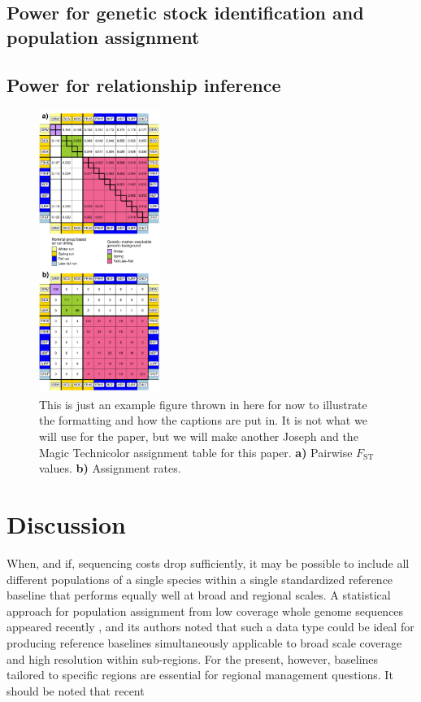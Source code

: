 \subsection*{Power for genetic stock identification and population assignment}

\subsection*{Power for relationship inference}

\begin{figure}
\newcommand{\examplecap}{\footnotesize This is just an example figure thrown
in here for now to illustrate the formatting and how the captions are put in. It is not what
we will use for the paper, but we will make another Joseph and the Magic Technicolor
assignment table for this paper.  {\bf a)} Pairwise $F_\mathrm{ST}$ values.
{\bf b)} Assignment rates.}
\begin{center}
\includegraphics[width=0.35\textwidth]{images/assign_and_fst_table.pdf}
\end{center}
\caption[\examplecap]{\examplecap}
\label{fig:example}
\end{figure}


\section*{Discussion}

When, and if, sequencing costs drop sufficiently, it may  be possible to include
all different populations of a single species within a single standardized reference baseline
that performs equally well at broad and regional scales. A statistical approach for population
assignment from low coverage whole genome sequences appeared recently
\citep{desaixINPRESSpopulation}, and its authors noted that such a data type could
be ideal for producing reference baselines simultaneously applicable to broad scale
coverage and high resolution within sub-regions.   For the present, however,
baselines tailored to specific regions are essential for regional management questions.
It should be noted that recent 

